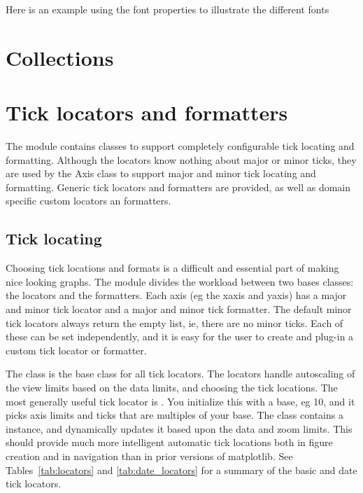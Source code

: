 \documentclass[]{book}
\begin{document}
Here is an example using the font properties to illustrate the
different fonts








\chapter{Collections}
\label{cha:collections}


\chapter{Tick locators and formatters}
\label{cha:tickers}

The  module contains classes to support
completely configurable tick locating and formatting.  Although the
locators know nothing about major or minor ticks, they are used by the
Axis class to support major and minor tick locating and formatting.
Generic tick locators and formatters are provided, as well as domain
specific custom locators an formatters.


\section{Tick locating}
\label{sec:ticklocs}

Choosing tick locations and formats is a difficult and essential part
of making nice looking graphs.  The  module
divides the workload between two bases classes: the locators and the
formatters.  Each axis (eg the xaxis and yaxis) has a major and minor
tick locator and a major and minor tick formatter.  The default minor
tick locators always return the empty list, ie, there are no minor
ticks.  Each of these can be set independently, and it is easy for the
user to create and plug-in a custom tick locator or formatter.

The  class is the base class for all
tick locators.  The locators handle autoscaling of the view limits
based on the data limits, and choosing the tick locations.  The most
generally useful tick locator is .  You
initialize this with a base, eg 10, and it picks axis limits and ticks
that are multiples of your base.  The class 
contains a  instance, and dynamically updates
it based upon the data and zoom limits.  This should provide much more
intelligent automatic tick locations both in figure creation and in
navigation than in prior versions of matplotlib.  See
Tables~\ref{tab:locators} and \ref{tab:date_locators} for a summary of
the basic and date tick locators.
\end{document}
